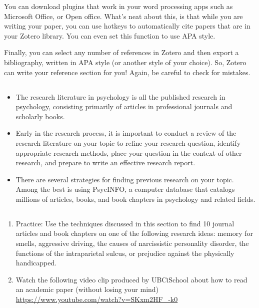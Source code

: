 You can download plugins that work in your word processing apps such as Microsoft Office, or Open office. What's neat about this, is that while you are writing your paper, you can use hotkeys to automatically cite papers that are in your Zotero library. You can even set this function to use APA style.

Finally, you can select any number of references in Zotero and then export a bibliography, written in APA style (or another style of your choice). So, Zotero can write your reference section for you! Again, be careful to check for mistakes.

\subsection{}
\begin{fullwidth}
\begin{itemize}
\item The research literature in psychology is all the published research in psychology, consisting primarily of articles in professional journals and scholarly books.
\item Early in the research process, it is important to conduct a review of the research literature on your topic to refine your research question, identify appropriate research methods, place your question in the context of other research, and prepare to write an effective research report.
\item There are several strategies for finding previous research on your topic. Among the best is using PsycINFO, a computer database that catalogs millions of articles, books, and book chapters in psychology and related fields.
\end{itemize}
\end{fullwidth}

\subsection{}
\begin{fullwidth}
\begin{enumerate}
\item Practice: Use the techniques discussed in this section to find 10 journal articles and book chapters on one of the following research ideas: memory for smells, aggressive driving, the causes of narcissistic personality disorder, the functions of the intraparietal sulcus, or prejudice against the physically handicapped.
\item Watch the following video clip produced by UBCiSchool about how to read an academic paper (without losing your mind) \url{https://www.youtube.com/watch?v=SKxm2HF_-k0}
\end{enumerate}
\end{fullwidth}  


